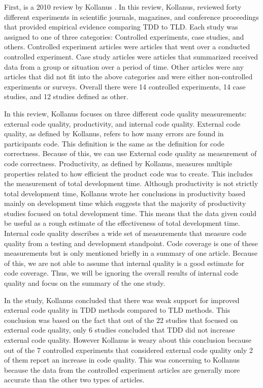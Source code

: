 \documentclass{sig-alternate}
\begin{document}
First, is a 2010 review by Kollanus \cite{Kollanus:2010}.  In this review, Kollanus,  reviewed forty different experiments in scientific journals, magazines, and conference proceedings that provided empirical evidence comparing TDD  to TLD.  Each study was assigned to one of three categories: Controlled experiments, case studies, and others.  Controlled experiment articles were articles that went over a conducted controlled experiment.  Case study articles were articles that summarized received data from a group or situation over a period of time.  Other articles were any articles that did not fit into the above categories and were either non-controlled experiments or surveys.  Overall there were 14 controlled experiments, 14 case studies, and 12 studies defined as other.  


In this review, Kollanus focuses on three different code quality measurements: external code quality, productivity, and internal code quality.  External code quality, as defined by Kollanus, refers to how many errors are found in participants code.  This definition is the same as the definition for code correctness.  Because of this, we can use External code quality as measurement of code correctness.  Productivity, as defined by Kollanus, measures multiple properties related to how efficient the product code was to create.  This includes the measurement of total development time.  Although productivity is not strictly total development time, Kollanus wrote her conclusions in productivity based mainly on development time which suggests that the majority of productivity studies focused on total development time.  This means that the data given could be useful as a rough estimate of the effectiveness of total development time.
Internal code quality describes a wide set of measurements that measure code quality from a testing and development standpoint.  Code coverage is one of these measurements but is only mentioned briefly in a summary of one article.  Because of this, we are not able to assume that internal quality is a good estimate for code coverage.  Thus, we will be ignoring the overall results of internal code quality and focus on the summary of the one study.


 In the study, Kollanus concluded that there was weak support for improved external code quality in TDD methods compared to TLD methods.  This conclusion was based on the fact that out of the 22 studies that focused on external code quality, only 6 studies concluded that TDD did not increase external code quality.  However Kollanus is weary about this conclusion because out of the 7 controlled experiments that considered external code quality only 2 of them report an increase in code quality.  This was concerning to Kollanus because the data from the controlled experiment articles are generally more accurate than the other two types of articles.  
 
\end{document}
